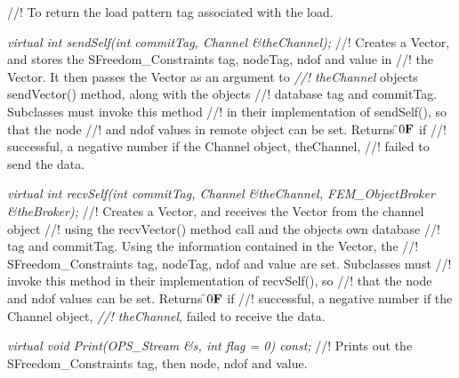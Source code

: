 //! To return the load pattern tag associated with the load.

{\em virtual int sendSelf(int commitTag, Channel \&theChannel);} 
//! Creates a Vector, and stores the SFreedom\_Constraints tag, nodeTag, ndof and value in
//! the Vector. It then passes the Vector as an argument to {\em
//! theChannel} objects sendVector() method, along with the objects 
//! database tag and \p commitTag. Subclasses must invoke this method
//! in their implementation of sendSelf(), so that the \p node
//! and \p ndof values in remote object can be set. Returns \f$0{\bf F}$ if
//! successful, a negative number if the Channel object, \p theChannel,
//! failed to send the data. 

{\em virtual int recvSelf(int commitTag, Channel \&theChannel, FEM\_ObjectBroker
\&theBroker);} 
//! Creates a Vector, and receives the Vector from the channel object
//! using the recvVector() method call and the objects own database
//! tag and \p commitTag. Using the information contained in the Vector, the 
//! SFreedom\_Constraints tag, nodeTag, ndof and value are set. Subclasses must
//! invoke this method in their implementation of recvSelf(), so
//! that the \p node and \p ndof values can be set. Returns \f$0{\bf F}$ if
//! successful, a negative number if the Channel object, {\em
//! theChannel}, failed to receive the data.   

{\em virtual void Print(OPS_Stream \&s, int flag = 0) const;}
//! Prints out the SFreedom\_Constraints tag, then \p node, \p ndof and
\p value. 

